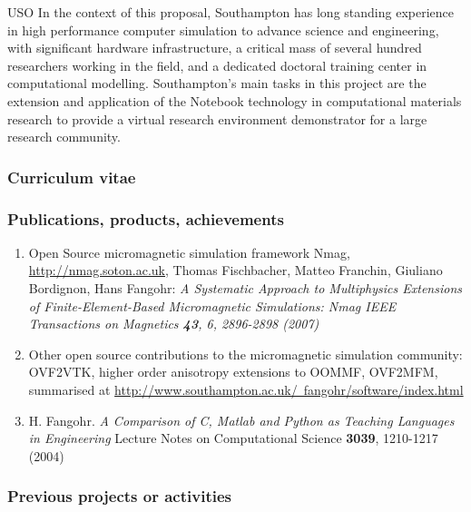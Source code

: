 \begin{sitedescription}{USO}
\medskip In the context of this proposal, Southampton has long
standing experience in high performance computer simulation to advance
science and engineering, with significant hardware infrastructure, a
critical mass of several hundred researchers working in the field, and
a dedicated doctoral training center in computational modelling.
Southampton's main tasks in this project are the extension and application of the
\Jupyter{} Notebook technology in computational materials research to
provide a virtual research environment demonstrator for a large research community.

\subsubsection*{Curriculum vitae}





%

\subsubsection*{Publications, products, achievements}

\begin{enumerate}
\item Open Source micromagnetic simulation framework Nmag,
  \href{http://nmag.soton.ac.uk}{http://nmag.soton.ac.uk}, Thomas
  Fischbacher, Matteo Franchin, Giuliano Bordignon, Hans Fangohr: \emph{
A Systematic Approach to Multiphysics Extensions of Finite-Element-Based Micromagnetic Simulations: Nmag 
IEEE Transactions on Magnetics \textbf{43}, 6, 2896-2898 (2007)}
\item Other open source contributions to the micromagnetic simulation
  community: OVF2VTK, higher order anisotropy extensions to OOMMF,
  OVF2MFM, summarised at
  \href{http://www.southampton.ac.uk/~fangohr/software/index.html}{http://www.southampton.ac.uk/~fangohr/software/index.html} 
\item H. Fangohr.
\emph{A Comparison of C, Matlab and Python as Teaching Languages in Engineering}
Lecture Notes on Computational Science \textbf{3039}, 1210-1217 (2004)
\end{enumerate}

\subsubsection*{Previous projects or activities}


\end{sitedescription}
